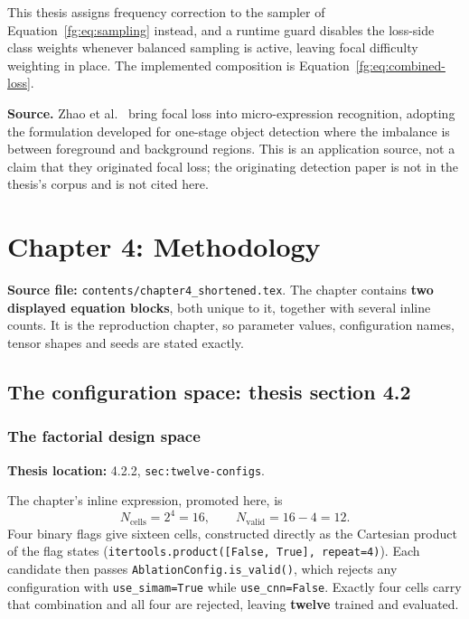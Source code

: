 \documentclass[11pt,a4paper]{article}
\numberwithin{equation}{section}
\begin{document}
This thesis assigns frequency correction to the sampler of
Equation~\eqref{fg:eq:sampling} instead, and a runtime guard disables the
loss-side class weights whenever balanced sampling is active, leaving focal
difficulty weighting in place. The implemented composition is
Equation~\eqref{fg:eq:combined-loss}.

\textbf{Source.} Zhao et al.~\cite{zhaoS2021} bring focal loss into
micro-expression recognition, adopting the formulation developed for one-stage
object detection where the imbalance is between foreground and background
regions. This is an application source, not a claim that they originated focal
loss; the originating detection paper is not in the thesis's corpus and is not
cited here.


\section{Chapter 4: Methodology}
\label{fg:chapter4}

\textbf{Source file:} \texttt{contents/chapter4\_shortened.tex}. The chapter
contains \textbf{two displayed equation blocks}, both unique to it, together
with several inline counts. It is the reproduction chapter, so parameter
values, configuration names, tensor shapes and seeds are stated exactly.

\subsection{The configuration space: thesis section 4.2}

\subsubsection{The factorial design space}
\label{fg:factorial}
\textbf{Thesis location:} 4.2.2, \texttt{sec:twelve-configs}.

The chapter's inline expression, promoted here, is
\begin{equation}
    N_{\mathrm{cells}}=2^4=16,
    \qquad N_{\mathrm{valid}}=16-4=12.
    \label{fg:eq:factorial}
\end{equation}
Four binary flags give sixteen cells, constructed directly as the Cartesian
product of the flag states
(\verb|itertools.product([False, True], repeat=4)|). Each candidate then
passes \verb|AblationConfig.is_valid()|, which rejects any configuration with
\texttt{use\_simam=True} while \texttt{use\_cnn=False}. Exactly four cells
carry that combination and all four are rejected, leaving \textbf{twelve}
trained and evaluated.
\end{document}
